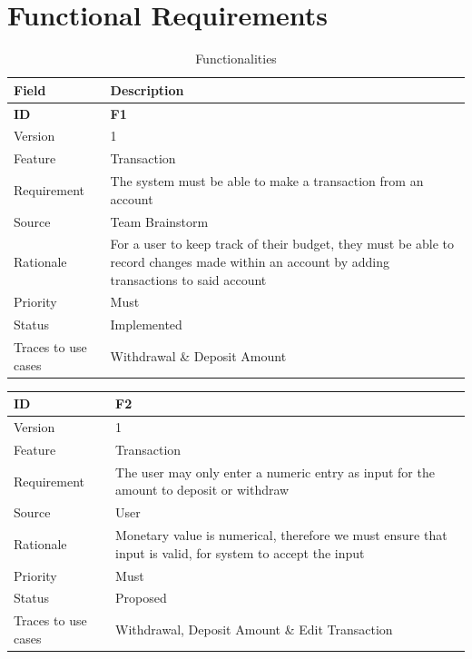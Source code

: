 \documentclass[12pt]{article}
\begin{document}
\section{Functional Requirements}
\begin{table}[H]
\caption{Functionalities}
  \begin{center}
    \begin{tabular}{|l|p{10cm}|}
      \hline
      Field & Description\\
      \hline\hline
      \bf ID & \bf {F1}\\
      \hline
      Version & 1\\
      \hline
      Feature & Transaction\\
      \hline
      Requirement & The system must be able to make a transaction from an account\\
      \hline
      Source & Team Brainstorm\\
      \hline
      Rationale & For a user to keep track of their budget, they must be able to record changes made within an account by adding transactions to said account\\
      \hline
      Priority & Must\\
      \hline
      Status & Implemented\\
      \hline
      Traces to use cases & Withdrawal \& Deposit Amount\\
      \hline
    \end{tabular}
  \end{center}
\end{table}
\begin{table}
  \begin{center}
    \begin{tabular}{|l|p{10cm}|}
      \hline
      \bf ID & \bf {F2}\\
      \hline
      Version & 1\\
      \hline
      Feature & Transaction\\
      \hline
      Requirement & The user may only enter a numeric entry as input for the amount to deposit or withdraw\\
      \hline
      Source & User\\
      \hline
      Rationale & Monetary value is numerical, therefore we must ensure that input is valid, for system to accept the input\\
      \hline
      Priority & Must\\
      \hline
      Status & Proposed\\
      \hline
      Traces to use cases & Withdrawal,  Deposit Amount \& Edit Transaction\\
      \hline
    \end{tabular}
  \end{center}
\end{table}
\end{document}
